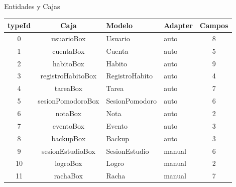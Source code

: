 \documentclass[11pt,landscape]{beamer}
\begin{document}
\begin{frame}{Entidades y Cajas}
  \centering
  \begin{tabular}{ccllc}
    \toprule
    \rowcolor{black!45}
    \textbf{typeId} & \textbf{Caja} & \textbf{Modelo} & \textbf{Adapter} & \textbf{Campos} \\
    \midrule
    0  & usuarioBox      & Usuario        & auto       & 8 \\
    1  & cuentaBox       & Cuenta         & auto       & 5 \\
    2  & habitoBox       & Habito         & auto       & 9 \\
    3  & registroHabitoBox & RegistroHabito & auto     & 4 \\
    4  & tareaBox        & Tarea          & auto       & 7 \\
    5  & sesionPomodoroBox & SesionPomodoro & auto     & 6 \\
    6  & notaBox         & Nota           & auto       & 2 \\
    7  & eventoBox       & Evento         & auto       & 3 \\
    8  & backupBox       & Backup         & auto       & 3 \\
    9  & sesionEstudioBox & SesionEstudio  & \alert{manual} & 6 \\
    10 & logroBox        & Logro          & \alert{manual} & 2 \\
    11 & rachaBox        & Racha          & \alert{manual} & 7 \\
    \bottomrule
  \end{tabular}
\end{frame}
\end{document}
